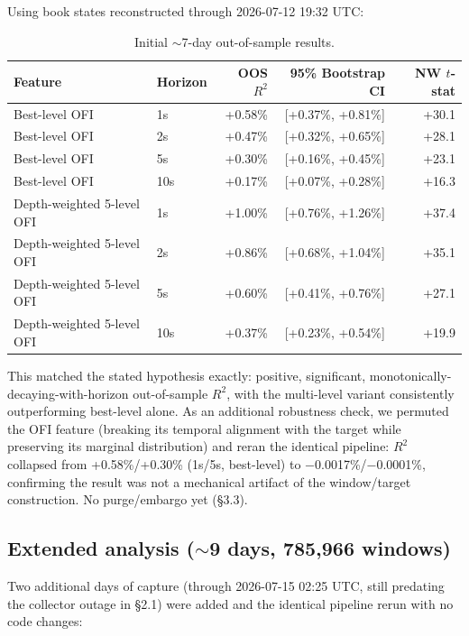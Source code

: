 \documentclass[11pt]{article}
\begin{document}
Using book states reconstructed through 2026-07-12 19:32 UTC:

\begin{table}[h]
\centering
\begin{tabular}{llrrr}
\toprule
Feature & Horizon & OOS $R^2$ & 95\% Bootstrap CI & NW $t$-stat \\
\midrule
Best-level OFI & 1s & +0.58\% & [+0.37\%, +0.81\%] & +30.1 \\
Best-level OFI & 2s & +0.47\% & [+0.32\%, +0.65\%] & +28.1 \\
Best-level OFI & 5s & +0.30\% & [+0.16\%, +0.45\%] & +23.1 \\
Best-level OFI & 10s & +0.17\% & [+0.07\%, +0.28\%] & +16.3 \\
Depth-weighted 5-level OFI & 1s & +1.00\% & [+0.76\%, +1.26\%] & +37.4 \\
Depth-weighted 5-level OFI & 2s & +0.86\% & [+0.68\%, +1.04\%] & +35.1 \\
Depth-weighted 5-level OFI & 5s & +0.60\% & [+0.41\%, +0.76\%] & +27.1 \\
Depth-weighted 5-level OFI & 10s & +0.37\% & [+0.23\%, +0.54\%] & +19.9 \\
\bottomrule
\end{tabular}
\caption{Initial $\sim$7-day out-of-sample results.}
\end{table}

This matched the stated hypothesis exactly: positive, significant, monotonically-decaying-with-horizon out-of-sample $R^2$, with the multi-level variant consistently outperforming best-level alone. As an additional robustness check, we permuted the OFI feature (breaking its temporal alignment with the target while preserving its marginal distribution) and reran the identical pipeline: $R^2$ collapsed from +0.58\%/+0.30\% (1s/5s, best-level) to $-$0.0017\%/$-$0.0001\%, confirming the result was not a mechanical artifact of the window/target construction. No purge/embargo yet (\S3.3).

\subsection{Extended analysis ($\sim$9 days, 785{,}966 windows)}

Two additional days of capture (through 2026-07-15 02:25 UTC, still predating the collector outage in \S2.1) were added and the identical pipeline rerun with no code changes:
\end{document}
